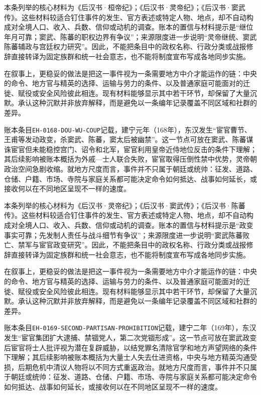 本条列举的核心材料为《后汉书·桓帝纪》；《后汉书·灵帝纪》；《后汉书·窦武传》。这些材料较适合钉住事件的发生、官方表述或特定人物、地点，却不自动构成对全境人口、收入、兵数、信仰或动机的调查。账本的置信与材料提示是“继位年月可靠；窦武、陈蕃的职权边界有争议”；来源限度进一步说明“灵帝继统、窦武陈蕃辅政与宫廷权力研究”。因此，不能把条目中的政权名称、行政分类或战报修辞直接转译为固定族群和统一社会意志，也不能将制度宣布写成各地同步实施。

在叙事上，更稳妥的做法是把这一事件视为一条需要地方中介才能运作的链：中央的命令、地方官与精英的选择、运输与劳力的条件、以及普通家庭可能面对的迁徙、赋役或安全风险彼此相连。现有材料能够显示其中若干环节，却保留了大量沉默。承认这种沉默并非放弃解释，而是避免以一条编年记录覆盖不同区域和社群的差异。

账本条目\texttt{EH-0168-DOU-WU-COUP}记载，建宁元年（168年），东汉发生“宦官曹节、王甫等发动政变，杀窦武、陈蕃，窦太后被幽禁”。这一节点可放在窦武、陈蕃谋诛宦官但未能稳控宫门、诏令和北军，宦官利用皇帝近侍地位反击的条件下理解；其后续影响被账本概括为外戚—士人联合失败，宦官取得压倒性禁中优势，灵帝朝政治空间急剧收缩。就地方尺度而言，事件并不只属于朝廷或统帅：征发、道路、仓储、户籍、市场、寺院与家庭关系都可能决定命令如何抵达、战事如何延长，或接收何以在不同地区呈现不一样的速度。

本条列举的核心材料为《后汉书·灵帝纪》；《后汉书·窦武传》；《后汉书·陈蕃传》。这些材料较适合钉住事件的发生、官方表述或特定人物、地点，却不自动构成对全境人口、收入、兵数、信仰或动机的调查。账本的置信与材料提示是“政变事实可靠；先发制人责任与战斗细节有争议”；来源限度进一步说明“窦武陈蕃败亡、禁军与宦官政变研究”。因此，不能把条目中的政权名称、行政分类或战报修辞直接转译为固定族群和统一社会意志，也不能将制度宣布写成各地同步实施。

在叙事上，更稳妥的做法是把这一事件视为一条需要地方中介才能运作的链：中央的命令、地方官与精英的选择、运输与劳力的条件、以及普通家庭可能面对的迁徙、赋役或安全风险彼此相连。现有材料能够显示其中若干环节，却保留了大量沉默。承认这种沉默并非放弃解释，而是避免以一条编年记录覆盖不同区域和社群的差异。

账本条目\texttt{EH-0169-SECOND-PARTISAN-PROHIBITION}记载，建宁二年（169年），东汉发生“宦官集团扩大逮捕、禁锢党人，第二次党锢形成”。这一节点可放在窦武政变后宦官将士人批评视为潜在复辟威胁，以结党罪名清除官学和地方声望网络的条件下理解；其后续影响被账本概括为大量士人失去仕进资格，中央与地方精英沟通受损，后期危机中清议人物将以不同方式重返政治。就地方尺度而言，事件并不只属于朝廷或统帅：征发、道路、仓储、户籍、市场、寺院与家庭关系都可能决定命令如何抵达、战事如何延长，或接收何以在不同地区呈现不一样的速度。

